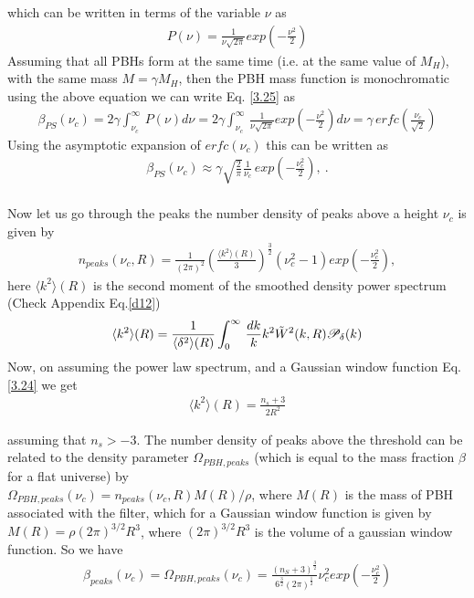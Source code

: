which can be written in terms of the variable $\nu$ as
\begin{align}
    P(\nu) = \frac{1}{\nu\sqrt{2\pi}}exp\left(- \frac{\nu^{2}}{2} \right) \label{3.27}
\end{align}
Assuming that all PBHs form at the same time (i.e. at the same value of $M_{H}$), with the same mass $M = \gamma M_H$, then the PBH mass function is monochromatic using the above equation we can write Eq. \ref{3.25} as
\begin{align}
    \beta_{PS}(\nu_c) = 2\gamma  \int_{\nu_c}^{\infty}\, P(\nu) d\nu = 2\gamma  \int_{\nu_c}^{\infty}\, \frac{1}{\nu\sqrt{2\pi}}exp\left(- \frac{\nu^{2}}{2} \right) d\nu = \gamma\,erfc\left(\frac{\nu_{c}}{\sqrt{2}} \right)\label{3.28}
\end{align}
Using the asymptotic expansion of $erfc(\nu_{c})$ this can be written as 
\begin{align}
     \beta_{PS}(\nu_c) \approx \gamma \sqrt{\frac{2}{\pi}}\frac{1}{\nu_{c}}\,exp\left(- \frac{\nu_{c}^{2}}{2} \right),\ \label{3.29}.
\end{align}\\
Now let us go through the peaks the number density of peaks above a height $\nu_{c}$ is given by
\begin{align}
    n_{peaks}(\nu_{c},R) = \frac{1}{(2\pi)^2} \left(\frac{\langle k^{2}\rangle(R)}{3}\right)^{\frac{3}{2}} (\nu_{c}^{2} - 1) exp\left(-\frac{\nu_{c}^{2}}{2} \right), \label{3.30}
\end{align}
here $\langle k^{2}\rangle(R)$ is the second moment of the smoothed density power spectrum (Check Appendix Eq.\ref{d12})
\begin{align}
    \langle k^{2}\rangle(R) = \frac{1}{ \langle \delta^{2}\rangle(R)} \int_{0}^{\infty} \,\frac{dk}{k} k^{2}  \Tilde{W}^{2}(k,R) \mathcal{P_{\delta}}(k) \label{3.31}
\end{align}
Now, on assuming the power law spectrum, and a Gaussian window function Eq. \ref{3.24} we get
\begin{align}
     \langle k^{2}\rangle(R) = \frac{n_{s}+3}{2R^{2}} \label{3.32}
\end{align}

assuming that $n_s > -3$. The number density of peaks above the threshold can be related to the density parameter $\Omega_{PBH, peaks}$ (which is equal to the mass fraction $\beta$ for a flat universe) by\\
$\Omega_{PBH, peaks}(\nu_{c}) = n_{peaks}(\nu_{c}, R)M(R)/\rho$, where $M(R)$ is the mass of PBH associated with the filter, which for a Gaussian window function is given by $M(R) = \rho(2\pi)^{3/2}R^3$, where $(2\pi)^{3/2}R^3$ is the volume of a gaussian window function. So we have
\begin{align}
    \beta_{peaks}(\nu_{c}) = \Omega_{PBH,peaks}(\nu_{c}) = \frac{(n_S + 3)^{\frac{3}{2}}}{6^{\frac{3}{2}}(2\pi)^{\frac{1}{2}}}\nu_{c}^{2}exp\left( - \frac{\nu_c^{2}}{2}\right) \label{3.33}
\end{align}

